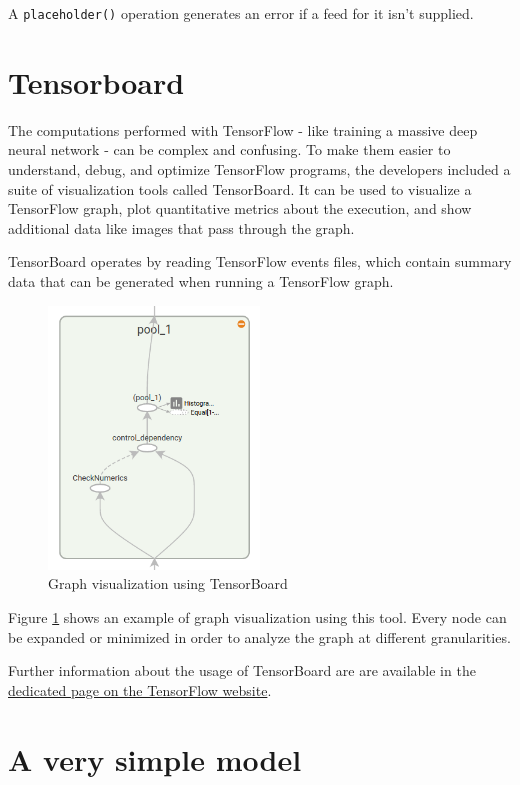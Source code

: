 A \lstinline|placeholder()| operation generates an error if a feed for it isn't supplied.

\section{Tensorboard}

The computations performed with TensorFlow - like training a massive deep neural network - can be complex and confusing. To make them easier to understand, debug, and optimize TensorFlow programs, the developers included a suite of visualization tools called TensorBoard. It can be used to visualize a TensorFlow graph, plot quantitative metrics about the execution, and show additional data like images that pass through the graph.

TensorBoard operates by reading TensorFlow events files, which contain summary data that can be generated when running a TensorFlow graph.

\begin{figure}
	\centering
	\includegraphics[width=0.5\textwidth]{Images/tensorboard}
	\caption{Graph visualization using TensorBoard}\label{fig:tensorboard}
\end{figure}

Figure \ref{fig:tensorboard} shows an example of graph visualization using this tool. Every node can be expanded or minimized in order to analyze the graph at different granularities.

Further information about the usage of TensorBoard are are available in the \href{https://www.tensorflow.org/how_tos/summaries_and_tensorboard/}{dedicated page on the TensorFlow website}.

\section{A very simple model}

